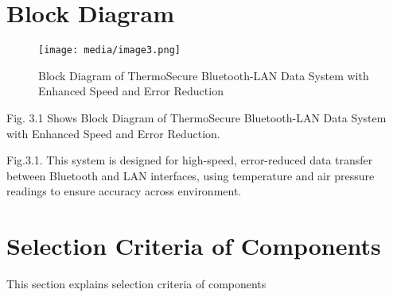 \documentclass[12pt]{report}
\begin{document}
\section{Block Diagram}
\begin{figure}[ht]
    \centering
    \texttt{[image: media/image3.png]}
    \caption{Block Diagram of ThermoSecure Bluetooth-LAN Data System with Enhanced Speed and Error Reduction}
    \label{fig:block_diagram_methodology}
\end{figure}
Fig. 3.1 Shows Block Diagram of ThermoSecure Bluetooth-LAN Data System with Enhanced Speed and Error Reduction.

Fig.3.1. This system is designed for high-speed, error-reduced data transfer between Bluetooth and LAN interfaces, using temperature and air pressure readings to ensure accuracy across environment.

\section{Selection Criteria of Components}
This section explains selection criteria of components
\end{document}
